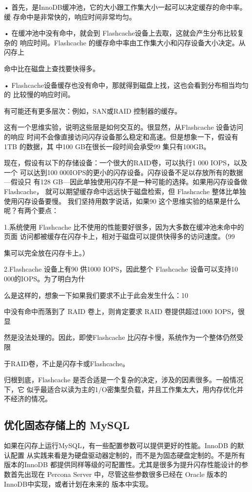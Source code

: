 • 首先，是InnoDB缓冲池，它的大小跟工作集大小一起可以决定缓存的命中率。缓
存命中是非常快的，响应时间非常均匀。

• 在缓冲池中没有命中，就会到 Flashcache设备上去取，这就会产生分布比较复杂的
响应时间。Flashcache 的缓存命中率由工作集大小和闪存设备大小决定。从闪存上

命中比在磁盘上查找要快得多。

• Flashcache设备缓存也没有命中，那就得到磁盘上找，这也会看到分布相当均匀的
比较慢的响应时间。

有可能还有更多层次：例如，SAN或RAID 控制器的缓存。

这有一个思维实验，说明这些层是如何交互的。很显然，从Flashcache 设备访问的响应
时间不会像直接访问闪存设备那么稳定和高速。但是想象一下，假设有1TB 的数据，其
中100 GB在很长一段时间会承受99%
集只有100GB。

现在，假设有以下的存储设备：一个很大的RAID卷，可以执行1 000 IOPS，以及一个
可以达到100 000IOPS的更小的闪存设备。闪存设备不足以存放所有的数据—假设只
有128 GB—因此单独使用闪存不是一种可能的选择。如果用闪存设备做 Flashcache，
就可以期望缓存命中远远快于磁盘检索，但 Flashcache 整体比单独使用闪存设备要慢。
我们坚持用数字说话，如果90%
这个思维实验的结果是什么呢？有两个要点：

1.系统使用 Flashcache 比不使用的性能要好很多，因为大多数在缓冲池未命中的页面
访问都被缓存在闪存卡上，相对于磁盘可以提供快得多的访问速度。（99%

集可以完全放在闪存卡上。）

2.Flashcache 设备上有90%
供1000 IOPS，因此整个 Flashcache 设备可以支持10 000的IOPS。为了明白为什

么是这样的，想象一下如果我们要求不止于此会发生什么：10%

中没有命中而落到了 RAID 卷上，则肯定要求 RAID 卷提供超过1000 IOPS，很显

然是没法处理的。因此，即使Flashcache 比闪存卡慢，系统作为一个整体仍然受限

于RAID卷，不止是闪存卡或Flashcache。

归根到底，Flashcache 是否合适是一个复杂的决定，涉及的因素很多。一般情况下，它
似乎最适合以读为主的1/O密集型负载，并且工作集太大，用内存优化并不经济的情况。
\subsection{优化固态存储上的 MySQL}
如果在闪存上运行MySQL，有一些配置参数可以提供更好的性能。InnoDB 的默认配置
从实践来看是为硬盘驱动器定制的，而不是为固态硬盘定制的。不是所有版本的InnoDB
都提供同样等级的可配置性。尤其是很多为提升闪存性能设计的参数首先出现在 Percona
Server 中，尽管这些参数很多已经在 Oracle 版本的InnoDB中实现，或者计划在未来的
版本中实现。


